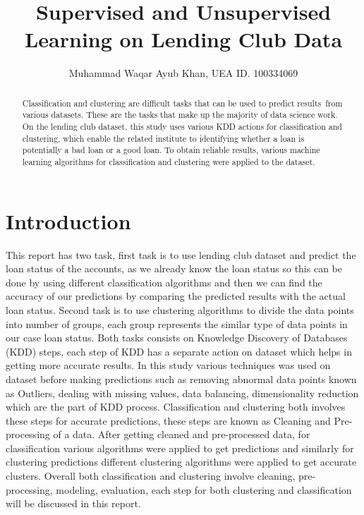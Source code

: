 \documentclass[12pt]{article}
\title{Supervised and Unsupervised Learning on Lending Club Data}
\author{Muhammad Waqar Ayub Khan, UEA ID. 100334069}
\begin{document}
\maketitle

\begin{abstract}
	
\onehalfspacing

Classification and clustering are difficult tasks that can be used to predict results from various datasets. These are the tasks that make up the majority of data science work. On the lending club dataset, this study uses various KDD actions for classification and clustering, which enable the related institute to identifying whether a loan is potentially a bad loan or a good loan. To obtain reliable results, various machine learning algorithms for classification and clustering were applied to the dataset.

\end{abstract}
\doublespacing

\section{Introduction}
This report has two task, first task is to use lending club dataset and predict the loan status of the accounts, as we already know the loan status so this can be done by using different classification algorithms and then we can find the accuracy of our predictions by comparing the predicted results with the actual loan status. Second task is to use clustering algorithms to divide the data points into number of groups, each group represents the similar type of data points in our case loan status. Both tasks consists on Knowledge Discovery of Databases (KDD) steps, each step of KDD has a separate action on dataset which helps in getting more accurate results. In this study various techniques was used on dataset before making predictions such as removing abnormal data points known as Outliers, dealing with missing values, data balancing, dimensionality reduction which are the part of KDD process. Classification and clustering both involves these steps for accurate predictions, these steps are known as Cleaning and Pre-processing of a data. After getting cleaned and pre-processed data, for classification various algorithms were applied to get predictions and similarly for clustering predictions different clustering algorithms were applied to get accurate clusters. Overall both classification and clustering involve cleaning, pre-processing, modeling, evaluation, each step for both clustering and classification will be discussed in this report.
\end{document}
